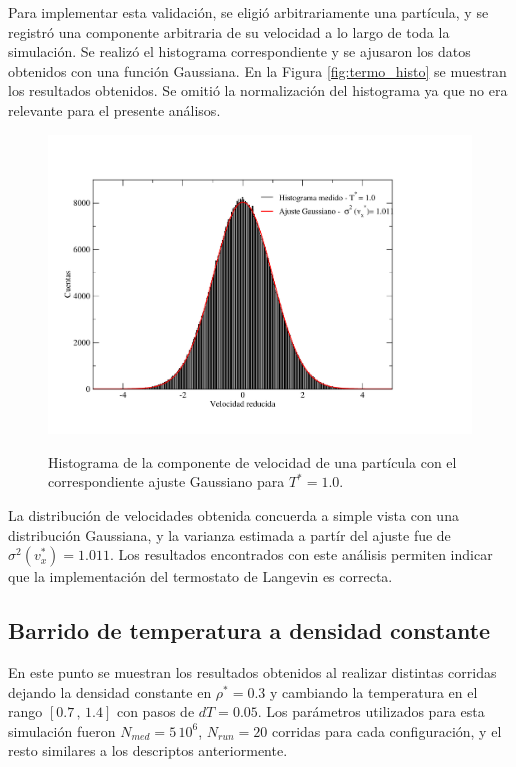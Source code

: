 \documentclass[a4paper,12pt]{article}
\begin{document}
Para implementar esta validación, se eligió arbitrariamente una partícula, y se 
registró una componente arbitraria de su velocidad a lo largo de toda la 
simulación. Se realizó el histograma correspondiente y se ajusaron los datos 
obtenidos con una función Gaussiana. En la Figura \eqref{fig:termo_histo} se 
muestran los resultados obtenidos. Se omitió la normalización del histograma ya 
que no era relevante para el presente análisos.

\begin{figure}[H]
  \centering
\includegraphics[scale=0.6]{termo_histograma.pdf} \\
\vspace{-2em}
\caption{Histograma de la componente de velocidad de una partícula con el 
correspondiente ajuste Gaussiano para $T^*=1.0$.}\label{fig:termo_histo}
\end{figure}

La distribución de velocidades obtenida concuerda a simple vista con una 
distribución Gaussiana, y la varianza estimada a partír del ajuste fue de 
$\sigma^2(v_x^*) = 1.011$. Los resultados encontrados con este análisis 
permiten indicar que la implementación del termostato de Langevin es correcta.
	

\subsection{Barrido de temperatura a densidad constante}

En este punto se muestran los resultados obtenidos al realizar distintas 
corridas dejando la densidad constante en $\rho^*=0.3$ y cambiando la 
temperatura en el rango $[0.7\, , \, 1.4]$ con pasos de $dT=0.05$. Los 
parámetros utilizados para esta simulación fueron $N_{med} = 5\,10^6$, 
$N_{run} = 20$ corridas para cada configuración, y el resto similares a los 
descriptos anteriormente.
\end{document}

